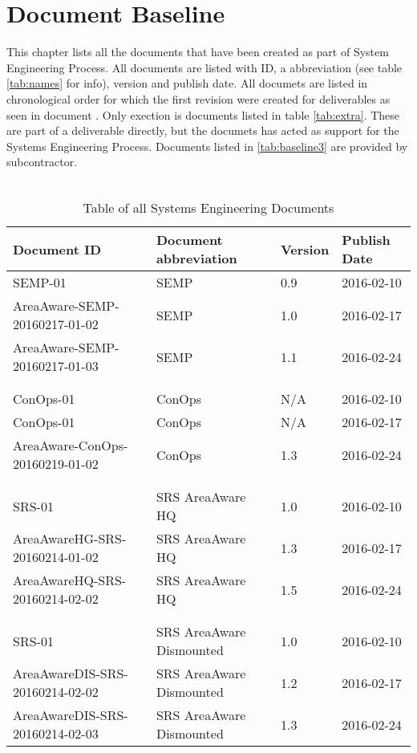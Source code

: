 %
\thispagestyle{fancy}
\chapter{Document Baseline}
\label{chp:baseline}
This chapter lists all the documents that have been created as part of System Engineering Process.
All documents are listed with ID, a abbreviation (see table \ref{tab:names} for info), version and publish date.
All documets are listed in chronological order for which the first revision were created for deliverables as seen in document \semp.
Only exection is documents listed in table \ref{tab:extra}. These are part of a deliverable directly, but the documets has acted as support for the Systems Engineering Process.
Documents listed in \ref{tab:baseline3} are provided by subcontractor.\\\\


\begin{table}[h]
    \centering
    \label{tab:baseline1}
    \begin{tabular}{llll}
    \textbf{Document ID} & \textbf{Document abbreviation} & \textbf{Version} & \textbf{Publish Date} \\ \hline
    SEMP-01 & SEMP & 0.9 & 2016-02-10 \\ \hline
    AreaAware-SEMP-20160217-01-02 & SEMP & 1.0 & 2016-02-17 \\ \hline
    AreaAware-SEMP-20160217-01-03 & SEMP & 1.1 & 2016-02-24 \\ \hline
    &  &  &  \\
    &  &  &  \\
    ConOps-01 & ConOps & N/A & 2016-02-10 \\ \hline
    ConOps-01 & ConOps & N/A & 2016-02-17\\ \hline
    AreaAware-ConOps-20160219-01-02 & ConOps & 1.3 & 2016-02-24\\ \hline
    &  &  &  \\
    &  &  &  \\
    SRS-01 & SRS AreaAware HQ & 1.0 & 2016-02-10 \\ \hline
    AreaAwareHG-SRS-20160214-01-02 & SRS AreaAware HQ & 1.3 & 2016-02-17 \\ \hline
    AreaAwareHQ-SRS-20160214-02-02 & SRS AreaAware HQ & 1.5 & 2016-02-24 \\ \hline
    &  &  &  \\
    &  &  &  \\
    SRS-01 & SRS AreaAware Dismounted & 1.0 & 2016-02-10 \\ \hline
    AreaAwareDIS-SRS-20160214-02-02 & SRS AreaAware Dismounted & 1.2 & 2016-02-17 \\ \hline
    AreaAwareDIS-SRS-20160214-02-03 & SRS AreaAware Dismounted & 1.3 & 2016-02-24 \\ \hline
    \end{tabular}
    \caption{Table of all Systems Engineering Documents}
\end{table}


